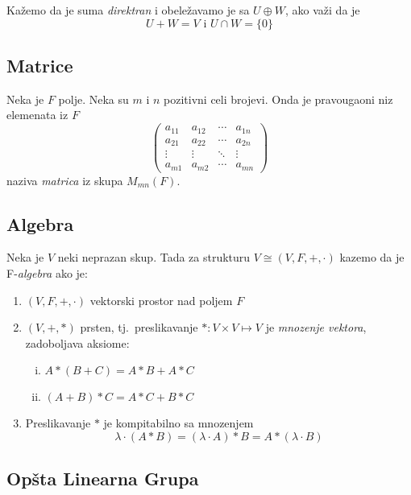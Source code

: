 \documentclass[12p,a4paper]{article}
\begin{document}
\begin{multicols}{2}
    Kažemo da je suma \textit{direktran} i obeležavamo je sa $U \oplus W$, 
    ako važi da je
    \[U + W = V \text{  i  } U \cap W = \{0\}\]

\subsection{Matrice}

    Neka je $F$ polje. Neka su $m$ i $n$ pozitivni celi brojevi. Onda je 
    pravougaoni niz elemenata iz $F$
    \[
        \begin{pmatrix}
            a_{11} & a_{12} & \cdots & a_{1n} \\
            a_{21} & a_{22} & \cdots & a_{2n} \\
            \vdots & \vdots & \ddots & \vdots \\
            a_{m1} & a_{m2} & \cdots & a_{mn}
        \end{pmatrix}
    \]
    naziva \textit{matrica} iz skupa $M_{mn}(F)$.


\subsection{Algebra}

    Neka je $V$ neki neprazan skup. Tada za strukturu 
    $V \cong (V, F, +, \cdot)$ kazemo da je F-\textit{algebra} ako je:
    \begin{enumerate}
        \itemsep0em
        \item [A.1] $(V, F, +, \cdot)$ vektorski prostor nad poljem $F$
        \item [A.2] $(V, +, *)$ prsten, tj.\ preslikavanje 
            $* : V \times V \mapsto V$ je \textit{mnozenje vektora}, 
            zadoboljava aksiome:
            \begin{enumerate} [(i)]
                \item $A * (B + C) = A * B + A * C$
                \item $(A + B) * C = A * C + B * C$
            \end{enumerate}
        \item [A.3] Preslikavanje $*$ je kompitabilno sa mnozenjem
            \[\lambda \cdot (A * B) = 
            (\lambda \cdot A) * B = 
            A * (\lambda \cdot B)\]
    \end{enumerate}


\subsection{Opšta Linearna Grupa}


\end{multicols}
\end{document}
